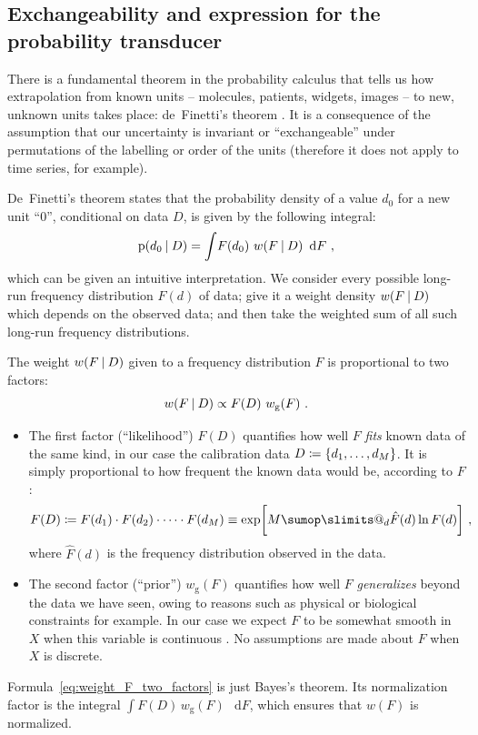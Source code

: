 \documentclass[a4paper,12pt,%
onecolumn,oneside,article,%
british%
]{memoir}
\makeatletter
\def\sum{\DOTSI\sumop\slimits@}
\newcommand*{\wrench}{{\fontencoding{U}\fontfamily{fontawesomethree}\selectfont\symbol{114}}}
\newcommand{\mynotew}[1]{{\footnotesize\color{notecolour}\wrench\ #1}}
\newcommand*{\di}{\mathop{}\!\mathrm{d}}%
\newcommand*{\defd}{\coloneqq}
\DeclarePairedDelimiter\set{\{}{\}} %
\newcommand*{\p}{\mathrm{p}}%
\renewcommand*{\|}[1][]{\nonscript\:#1\vert\nonscript\:\mathopen{}}
\newcommand*{\chap}{ch.}%
\newcommand*{\wf}{w}
\newcommand*{\wfo}{w_{\textrm{g}}}
\makeatother
\begin{document}
\subsection{Exchangeability and expression for the probability transducer}
\label{sec:deFinetti}



There is a fundamental theorem in the probability calculus that tells us how extrapolation from known units -- molecules, patients, widgets, images -- to new, unknown units takes place: de~Finetti's theorem \autocites[\chap~4]{bernardoetal1994_r2000}{dawid2013,definetti1929,definetti1937}. It is a consequence of the assumption that our uncertainty is invariant or \enquote{exchangeable} under permutations of the labelling or order of the units (therefore it does not apply to time series, for example).

De~Finetti's theorem states that the probability density of a value $d_{0}$ for a new unit \enquote{0}, conditional on data $D$, is given by the following integral:
\begin{equation}
  \label{eq:prob_is_expe_freq}
  \p(d_{0} \| D) = \int\! F(d_{0})\ \wf(F \| D)\ \di F \ ,
\end{equation}
which can be given an intuitive interpretation. We consider every possible long-run frequency distribution $F(d)$ of data; give it a weight density $\wf(F \| D)$ which depends on the observed data; and then take the weighted sum of all such long-run frequency distributions.

The weight $\wf(F \| D)$ given to a frequency distribution $F$ is proportional to two factors:
\begin{equation}
  \label{eq:weight_F_two_factors}
  \wf(F \| D) \propto F(D)\ \wfo(F) \ .
\end{equation}
\begin{itemize}
  \item The first factor (\enquote{likelihood}) $F(D)$ quantifies how well $F$ \emph{fits} known data of the same kind, in our case the calibration data $D \defd \set{d_{1}, \dotsc, d_{M}}$. It is simply proportional to how frequent the known data would be, according to $F$:
  \begin{equation}
    \label{eq:factor_likelihood}
    F(D) \defd F(d_{1})\cdot F(d_{2})\cdot \dotsm\cdot F(d_{M})
    \equiv \exp\biggl[M \sum_{d} \hat{F}(d) \ln F(d)\biggr] \ ,
  \end{equation}
where $\hat{F}(d)$ is the frequency distribution observed in the data.
  
\item The second factor (\enquote{prior}) $\wfo(F)$ quantifies how well $F$ \emph{generalizes} beyond the data we have seen, owing to reasons such as physical or biological constraints for example. In our case we expect $F$ to be somewhat smooth in $X$ when this variable is continuous \autocites[Cf.][]{goodetal1971}. No assumptions are made about $F$ when $X$ is discrete.
\end{itemize}
Formula~\eqref{eq:weight_F_two_factors} is just Bayes's theorem. Its normalization factor is the integral $\int F(D)\, \wfo(F)\, \di F$, which ensures that $\wf(F)$ is normalized.
\end{document}
